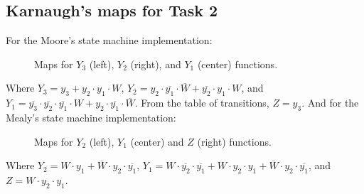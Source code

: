 \newpage
\subsection*{Karnaugh's maps for Task 2}
For the Moore's state machine implementation:
\begin{figure}[H]
    \begin{center}
    \begin{KarnaughV2}
    \end{KarnaughV2}
    \begin{KarnaughV2}
    \end{KarnaughV2}
    \begin{KarnaughV2}
    \end{KarnaughV2}
    \caption{Maps for $Y_3$ (left), $Y_2$ (right), and $Y_1$ (center) functions.}
\end{center}
\end{figure}

Where $Y_3 = y_3 + y_2 \cdot y_1 \cdot W$, $Y_2 = y_2 \cdot \overline{y_1} \cdot \overline{W} + \overline{y_2} \cdot y_1 \cdot W$,
and $Y_1 = \overline{y_3} \cdot \overline{y_2} \cdot \overline{y_1} \cdot W + y_2 \cdot \overline{y_1} \cdot \overline{W}$.
From the table of transitions, $Z = y_3$.
And for the Mealy's state machine implementation:

\begin{figure}[H]
    \begin{center}
         \begin{KarnaughvuitV2}
         \end{KarnaughvuitV2}
         \begin{KarnaughvuitV2}
         \end{KarnaughvuitV2}
         \begin{KarnaughvuitV2}
         \end{KarnaughvuitV2}
         \caption{Maps for $Y_2$ (left), $Y_1$ (center) and $Z$ (right) functions.}
    \end{center}
    \end{figure}
Where $Y_2 = W \cdot y_1 + \overline{W} \cdot y_2 \cdot \overline{y_1}$, $Y_1 = W \cdot \overline{y_2} \cdot \overline{y_1} + W \cdot y_2 \cdot y_1 + \overline{W} \cdot y_2 \cdot \overline{y_1}$, 
and $Z = W \cdot y_2 \cdot y_1$.